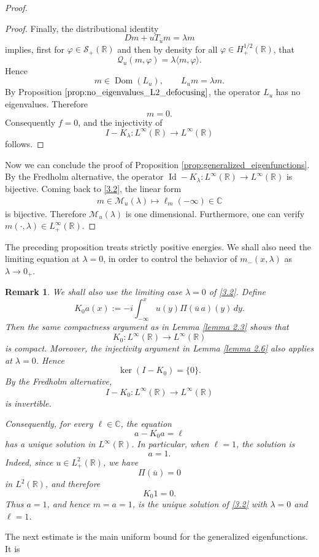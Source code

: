 \documentclass[10pt]{article}
\newtheorem{remark}[theorem]{Remark}
\numberwithin{equation}{section}
\numberwithin{theorem}{section}
\begin{document}
\begin{proof}
\begin{proof}
Finally, the distributional identity
\[
D m+uT_{\bar u}m=\lambda m
\]
implies, first for \(\varphi\in\mathcal S_+(\mathbb R)\) and then by density for
all \(\varphi\in H^{1/2}_+(\mathbb R)\), that
\[
\mathcal Q_u(m,\varphi)
=
\lambda\langle m,\varphi\rangle .
\]
Hence
\[
m\in\operatorname{Dom}(L_u),
\qquad
L_um=\lambda m .
\]
By Proposition \(\ref{prop:no_eigenvalues_L2_defocusing}\), the operator \(L_u\)
has no eigenvalues. Therefore
\[
m=0.
\]
Consequently \(f=0\), and the injectivity of
\[
I-K_\lambda:L^\infty(\mathbb R)\to L^\infty(\mathbb R)
\]
follows.
\end{proof}
\noindent Now we can conclude the proof of Proposition \ref{prop:generalized_eigenfunctions}. By the Fredholm alternative, the operator $\operatorname{Id}-K_\lambda: L^{\infty}(\mathbb{R}) \rightarrow L^{\infty}(\mathbb{R})$ is bijective. Coming back to \eqref{3.2}, the linear form 
\begin{align*}
m \in \mathscr{M}_u(\lambda) \mapsto \ell_m(-\infty) \in \mathbb{C}
\end{align*}
is bijective. Therefore $\mathscr{M}_u(\lambda)$ is one dimensional.  Furthermore, one can verify \(m(\cdot,\lambda)\in L^\infty_+(\mathbb R)\).
\end{proof}
The preceding proposition treats strictly positive energies. We shall also need the
limiting equation at \(\lambda=0\), in order to control the behavior of \(m_-(x,\lambda)\) as \(\lambda\to0_+\).
\begin{remark}
\label{remark 2.7}
We shall also use the limiting case \(\lambda=0\) of \eqref{3.2}. Define
\[
K_0a(x)
:=
-i\int_{-\infty}^x
u(y)\Pi(\overline u\,a)(y)\,dy .
\]
Then the same compactness argument as in Lemma \ref{lemma 2.3} shows that
\[
K_0:L^\infty(\mathbb R)\to L^\infty(\mathbb R)
\]
is compact. Moreover, the injectivity argument in Lemma \ref{lemma 2.6} also applies at
\(\lambda=0\). Hence
\[
\ker(I-K_0)=\{0\}.
\]
By the Fredholm alternative,
\[
I-K_0:L^\infty(\mathbb R)\to L^\infty(\mathbb R)
\]
is invertible.

Consequently, for every \(\ell\in\mathbb C\), the equation
\[
a-K_0a=\ell
\]
has a unique solution in \(L^\infty(\mathbb R)\). In particular, when \(\ell=1\), the
solution is
\[
a=1.
\]
Indeed, since \(u\in L^2_+(\mathbb R)\), we have
\[
\Pi(\overline u)=0
\]
in \(L^2(\mathbb R)\), and therefore
\[
K_0 1=0.
\]
Thus \(a=1\), and hence \(m=a=1\), is the unique solution of \eqref{3.2} with
\(\lambda=0\) and \(\ell=1\).
\end{remark}
\noindent
The next estimate is the main uniform bound for the generalized eigenfunctions. It is
\end{document}
